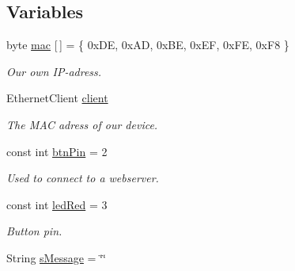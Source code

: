 \subsection*{Variables}
\begin{DoxyCompactItemize}
\item 
\mbox{\label{_arduino_morse_client_8ino_aea3f7775fecafb66a619eb2dcb0357bd}} 
byte \mbox{\hyperlink{_arduino_morse_client_8ino_aea3f7775fecafb66a619eb2dcb0357bd}{mac}} \mbox{[}$\,$\mbox{]} = \{ 0x\+D\+E, 0x\+A\+D, 0x\+B\+E, 0x\+E\+F, 0x\+F\+E, 0x\+F8 \}
\begin{DoxyCompactList}\small\item\em Our own I\+P-\/adress. \end{DoxyCompactList}\item 
\mbox{\label{_arduino_morse_client_8ino_a058da3453d064890d1eb0a5e2f730807}} 
Ethernet\+Client \mbox{\hyperlink{_arduino_morse_client_8ino_a058da3453d064890d1eb0a5e2f730807}{client}}
\begin{DoxyCompactList}\small\item\em The M\+AC adress of our device. \end{DoxyCompactList}\item 
\mbox{\label{_arduino_morse_client_8ino_a67fc04bcef82c18a95567e37e5695fc3}} 
const int \mbox{\hyperlink{_arduino_morse_client_8ino_a67fc04bcef82c18a95567e37e5695fc3}{btn\+Pin}} = 2
\begin{DoxyCompactList}\small\item\em Used to connect to a webserver. \end{DoxyCompactList}\item 
\mbox{\label{_arduino_morse_client_8ino_abdaa7e302e35cf528bfcf79a08bf44bf}} 
const int \mbox{\hyperlink{_arduino_morse_client_8ino_abdaa7e302e35cf528bfcf79a08bf44bf}{led\+Red}} = 3
\begin{DoxyCompactList}\small\item\em Button pin. \end{DoxyCompactList}\item 
\mbox{\label{_arduino_morse_client_8ino_a5549cda51b5cdfaa580b2afff4aa9614}} 
String \mbox{\hyperlink{_arduino_morse_client_8ino_a5549cda51b5cdfaa580b2afff4aa9614}{s\+Message}} = \char`\"{}\char`\"{}

\end{DoxyCompactItemize}
